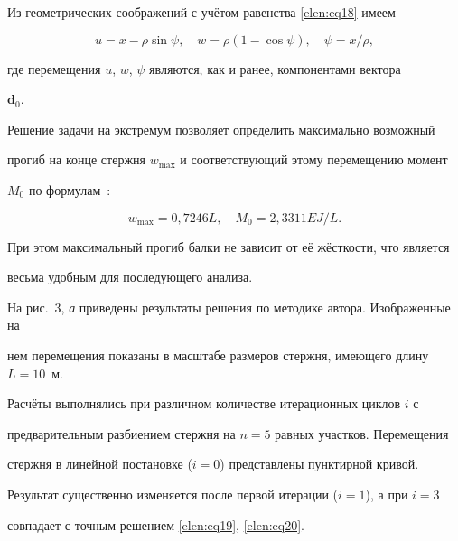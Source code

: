 Из геометрических соображений с учётом равенства \eqref{elen:eq18} имеем

\begin{equation}

\label{elen:eq19}

 u=x-\rho \sin \psi , \quad w=\rho (1-\cos \psi

), \quad \psi =x/\rho,

\end{equation}

где перемещения $u$, $w$, $\psi $ являются, как и ранее, компонентами вектора

$\textbf{d}_0$.



Решение задачи на экстремум позволяет определить максимально возможный

прогиб на конце стержня $w_{\max}$ и соответствующий этому перемещению момент

$M_0$ по формулам~\cite{elen:bib6}:

\begin{equation}

\label{elen:eq20}

 w_{\max } =0,7246L, \quad M_0

=2,3311 EJ/L.

\end{equation}



При этом максимальный прогиб балки не зависит от её жёсткости, что является

весьма удобным для последующего анализа.



На рис.~3, {\sl а} приведены результаты решения по методике автора. Изображенные на

нем перемещения показаны в масштабе размеров стержня, имеющего длину $L=10$~м.

Расчёты выполнялись при различном количестве итерационных циклов $i$ с

предварительным разбиением стержня на $n=5$ равных участков. Перемещения

стержня в линейной постановке ($i=0$) представлены пунктирной кривой.

Результат существенно изменяется после первой итерации ($i=1$), а при $i=3$

совпадает с точным решением \eqref{elen:eq19}, \eqref{elen:eq20}.







